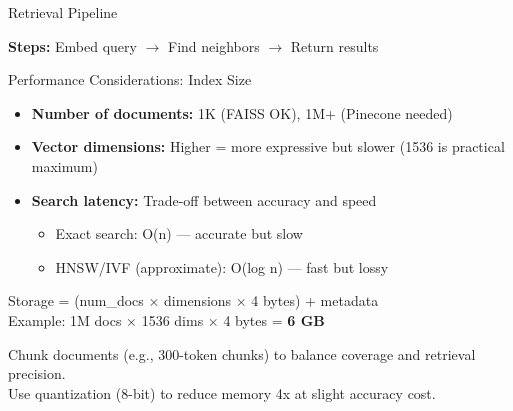 \documentclass[aspectratio=169,11pt]{beamer}
\begin{document}
\begin{frame}{Retrieval Pipeline}

  \textbf{Steps:} Embed query $\to$ Find neighbors $\to$ Return results
\end{frame}

\begin{frame}{Performance Considerations: Index Size}
  \begin{itemize}
    \setlength{\itemsep}{1pt}
    \item \textbf{Number of documents:} 1K (FAISS OK), 1M+ (Pinecone needed)
    \item \textbf{Vector dimensions:} Higher = more expressive but slower (1536 is practical maximum)
    \item \textbf{Search latency:} Trade-off between accuracy and speed
      \begin{itemize}
    \setlength{\itemsep}{1pt}
        \item Exact search: O(n) — accurate but slow
        \item HNSW/IVF (approximate): O(log n) — fast but lossy
      \end{itemize}
  \end{itemize}

  \vspace{0.05cm}
  \begin{conceptbox}
    Storage = (num\_docs × dimensions × 4 bytes) + metadata\\
    Example: 1M docs × 1536 dims × 4 bytes = \textbf{6 GB}
  \end{conceptbox}

  \vspace{0.07cm}
  \begin{tipbox}
    Chunk documents (e.g., 300-token chunks) to balance coverage and retrieval precision.\\
    Use quantization (8-bit) to reduce memory 4x at slight accuracy cost.
  \end{tipbox}
\end{frame}
\end{document}
